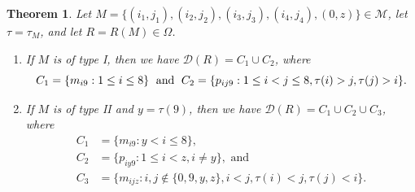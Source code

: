\documentclass[11pt]{amsart}
\theoremstyle{plain}
\newtheorem{theorem}{Theorem}[section]
\theoremstyle{definition}
\theoremstyle{remark}
\numberwithin{equation}{section}
\newcommand{\res}{\mathscr{D}}
\newcommand{\calm}{\mathcal{M}}
\newcommand{\ob}{\Omega}
\begin{document}
\begin{theorem}
\label{thm:mob_res}
Let $M=\{(i_1,j_1), (i_2,j_2), (i_3,j_3), (i_4,
j_4),(0,z)\}\in \calm$, let $\tau=\tau_M$, and let $R=R(M)\in \ob$.
\begin{enumerate}
\item If $M$ is of type I, then  we have
$\res(R)=C_1 \cup C_2$,
where 
  \[
    C_1=\{m_{i9}: 1\le i\le 8\} \text{\; and\; } C_2=  \{p_{ij9}: 1\le i<j\le 8,
    \tau(i)>j, \tau(j)>i\}. 
  \]
\item If $M$ is of type II and $y=\tau(9)$, then we have $\res(R)=C_1\cup
  C_2\cup C_3$,  where
  \begin{align*} 
  C_1&=\{m_{i9}: y<i\le 8\},\\
  C_2&=\{p_{iy9}: 1\le i<z, i\neq y\},\text{ and}\\
  C_3&=\{m_{ijz}: i, j\notin \{0,9,y,z\}, i<j, \tau(i)<j,\tau(j)<i\}. 
  \end{align*}
\end{enumerate}
\end{theorem}
\end{document}
